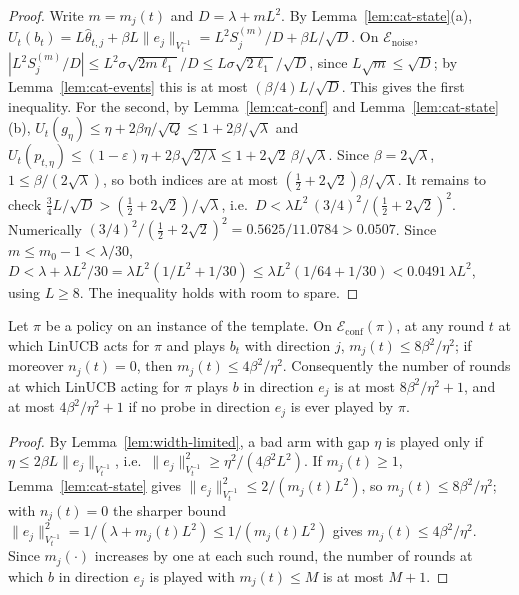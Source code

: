 \documentclass[anon]{alt2027} %
\newcommand{\eps}{\varepsilon}
\begin{document}
\begin{proof}
Write $m=m_j(t)$ and $D=\lambda+mL^2$. By Lemma~\ref{lem:cat-state}(a),
$U_t(b_t)=L\widehat\theta_{t,j}+\beta L\|e_j\|_{V_t^{-1}}=L^2S_j^{(m)}/D+\beta L/\sqrt D$.
On $\mathcal E_{\mathrm{noise}}$, $|L^2S_j^{(m)}/D|\le L^2\sigma\sqrt{2m\ell_1}/D\le L\sigma\sqrt{2\ell_1}/\sqrt D$,
since $L\sqrt m\le\sqrt D$; by Lemma~\ref{lem:cat-events} this is at most
$(\beta/4)L/\sqrt D$. This gives the first inequality. For the second, by
Lemma~\ref{lem:cat-conf} and Lemma~\ref{lem:cat-state}(b),
$U_t(g_\eta)\le\eta+2\beta\eta/\sqrt Q\le1+2\beta/\sqrt\lambda$ and
$U_t(p_{t,\eta})\le(1-\eps)\eta+2\beta\sqrt{2/\lambda}\le1+2\sqrt2\,\beta/\sqrt\lambda$.
Since $\beta=2\sqrt\lambda$, $1\le\beta/(2\sqrt\lambda)$, so both indices are at
most $(\tfrac12+2\sqrt2)\beta/\sqrt\lambda$. It remains to check
$\tfrac34L/\sqrt D>(\tfrac12+2\sqrt2)/\sqrt\lambda$, i.e.\
$D<\lambda L^2\,(3/4)^2/(\tfrac12+2\sqrt2)^2$. Numerically
$(3/4)^2/(\tfrac12+2\sqrt2)^2=0.5625/11.0784>0.0507$. Since $m\le m_0-1<\lambda/30$,
$D<\lambda+\lambda L^2/30=\lambda L^2(1/L^2+1/30)\le\lambda L^2(1/64+1/30)<0.0491\,\lambda L^2$,
using $L\ge8$. The inequality holds with room to spare.
\end{proof}

\begin{lemma}
\label{lem:cat-cap}
Let $\pi$ be a policy on an instance of the template. On
$\mathcal E_{\mathrm{conf}}(\pi)$, at any round $t$ at which LinUCB acts for
$\pi$ and plays $b_t$ with direction $j$, $m_j(t)\le8\beta^2/\eta^2$; if
moreover $n_j(t)=0$, then $m_j(t)\le4\beta^2/\eta^2$. Consequently the number
of rounds at which LinUCB acting for $\pi$ plays $b$ in direction $e_j$ is at
most $8\beta^2/\eta^2+1$, and at most $4\beta^2/\eta^2+1$ if no probe in
direction $e_j$ is ever played by $\pi$.
\end{lemma}

\begin{proof}
By Lemma~\ref{lem:width-limited}, a bad arm with gap $\eta$ is played only if
$\eta\le2\beta L\|e_j\|_{V_t^{-1}}$, i.e.\ $\|e_j\|^2_{V_t^{-1}}\ge\eta^2/(4\beta^2L^2)$.
If $m_j(t)\ge1$, Lemma~\ref{lem:cat-state} gives $\|e_j\|^2_{V_t^{-1}}\le2/(m_j(t)L^2)$,
so $m_j(t)\le8\beta^2/\eta^2$; with $n_j(t)=0$ the sharper bound
$\|e_j\|^2_{V_t^{-1}}=1/(\lambda+m_j(t)L^2)\le1/(m_j(t)L^2)$ gives $m_j(t)\le4\beta^2/\eta^2$.
Since $m_j(\cdot)$ increases by one at each such round, the number of rounds
at which $b$ in direction $e_j$ is played with $m_j(t)\le M$ is at most $M+1$.
\end{proof}
\end{document}
